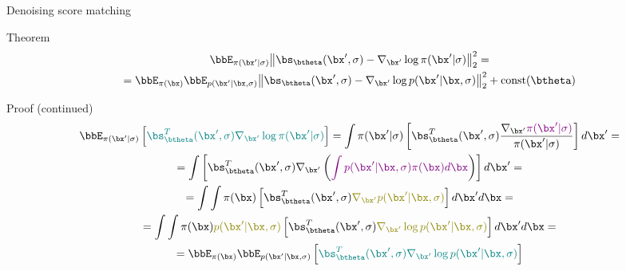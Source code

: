 \begin{frame}{Denoising score matching}
	\begin{block}{Theorem}
	\vspace{-0.5cm}
	\begin{multline*}
		\bbE_{\pi(\bx' | \sigma)}\bigl\| \bs_{\btheta}(\bx', \sigma) - \nabla_{\bx'} \log \pi(\bx' | \sigma) \bigr\|^2_2 = \\
		= \bbE_{\pi(\bx)} \bbE_{p(\bx' | \bx, \sigma)}\bigl\| \bs_{\btheta}(\bx', \sigma) - \nabla_{\bx'} \log p(\bx' | \bx, \sigma) \bigr\|^2_2 + \text{const}(\btheta)
	\end{multline*}
	\vspace{-0.5cm}
	\end{block}
	\begin{block}{Proof (continued)}
		\vspace{-0.7cm}
		{\small
		\begin{multline*}
			\bbE_{\pi(\bx' | \sigma)} \left[{\color{teal}\bs_{\btheta}^T(\bx', \sigma) \nabla_{\bx'} \log \pi(\bx' | \sigma)} \right] = \int \pi(\bx' | \sigma) \left[\bs_{\btheta}^T(\bx', \sigma) \frac{\nabla_{\bx'} {\color{violet}\pi(\bx' | \sigma)}}{\pi(\bx' | \sigma)} \right] d \bx' = \\
			= \int \left[\bs_{\btheta}^T(\bx', \sigma) \nabla_{\bx'}\left({\color{violet}\int p(\bx' | \bx, \sigma) \pi(\bx) d\bx}\right) \right] d \bx' = \\
			=  \int \int \pi(\bx) \left[\bs_{\btheta}^T(\bx', \sigma) {\color{olive}\nabla_{\bx'}p(\bx' | \bx, \sigma)} \right] d \bx' d\bx = \\
			= \int \int \pi(\bx) {\color{olive} p(\bx' | \bx, \sigma)} \left[\bs_{\btheta}^T(\bx', \sigma) {\color{olive}\nabla_{\bx'} \log p(\bx' | \bx, \sigma)} \right] d \bx' d\bx = \\
			= \bbE_{\pi(\bx)} \bbE_{p(\bx' | \bx, \sigma)} \left[{\color{teal}\bs_{\btheta}^T(\bx', \sigma) \nabla_{\bx'} \log p(\bx' | \bx, \sigma)} \right]
		\end{multline*}
		}
	\end{block}
\end{frame}
